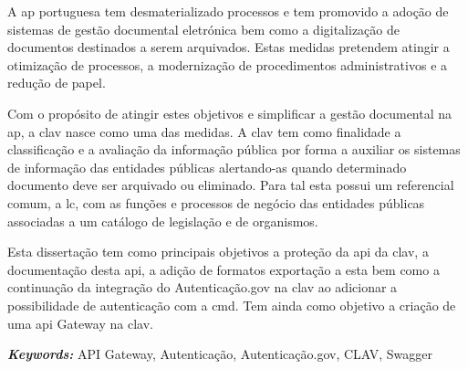 A \acrlong{ap} portuguesa tem desmaterializado processos e tem promovido a adoção de sistemas de gestão documental eletrónica bem como a digitalização de documentos destinados a serem arquivados. Estas medidas pretendem atingir a otimização de processos, a modernização de procedimentos administrativos e a redução de papel.

Com o propósito de atingir estes objetivos e simplificar a gestão documental na \acrlong{ap}, a \acrfull{clav} nasce como uma das medidas. A \acrshort{clav} tem como finalidade a classificação e a avaliação da informação pública por forma a auxiliar os sistemas de informação das entidades públicas alertando-as quando determinado documento deve ser arquivado ou eliminado. Para tal esta possui um referencial comum, a \acrlong{lc}, com as funções e processos de negócio das entidades públicas associadas a um catálogo de legislação e de organismos.

Esta dissertação tem como principais objetivos a proteção da \acrshort{api} da \acrshort{clav}, a documentação desta \acrshort{api}, a adição de formatos exportação a esta bem como a continuação da integração do Autenticação.gov na \acrshort{clav} ao adicionar a possibilidade de autenticação com a \acrlong{cmd}. Tem ainda como objetivo a criação de uma \acrshort{api} Gateway na \acrshort{clav}.

\vspace{1cm}

\textit{\textbf{Keywords:}} API Gateway, Autenticação, Autenticação.gov, CLAV, Swagger  
